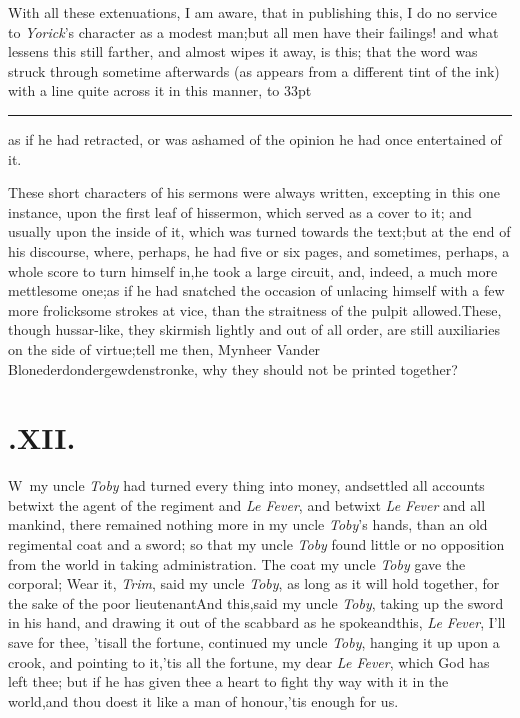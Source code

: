 \documentclass{article}
\begin{document}
With all these extenuations, I am aware, that in publishing
this, I do no service to \textit{Yorick}’s character as a
modest man;\tsk but all men have their failings! and what lessens
this still farther, and almost wipes it away, is this; that the
word was struck through sometime afterwards (as appears from a
different tint of the ink) with a line quite across it in this manner,
\hbox to 33pt{\leaders\hrule width 1pt height 3.4pt depth -3.1pt\hfill}\tsh as if he had retracted, or was
ashamed of the opinion he had once entertained of it.

These short characters of his sermons were always written,
excepting in this one instance, upon the first leaf of his\pb sermon,
which served as a cover to it; and usually upon the inside of it,
which was turned towards the text;\tsk but at the end of his
discourse, where, perhaps, he had five or six pages, and sometimes,
perhaps, a whole score to turn himself in,\tsk he took a large
circuit, and, indeed, a much more mettlesome one;\tsk as if he
had snatched the occasion of unlacing himself with a few more
frolicksome strokes at vice, than the straitness of the pulpit
allowed.\tsk These, though hussar-like, they skirmish lightly and
out of all order, are still auxiliaries on the side of
virtue;\tsk tell me then, Mynheer Vander
Blonederdondergewdenstronke, why they should not be printed
together?

\section{.\enspace XII.}

\lettrine{W}{\,} my uncle \textit{Toby} had turned
every thing into money, and\break settled all accounts betwixt the agent
of the regiment and \textit{Le Fever}, and betwixt \textit{Le Fever}
and all mankind,\tsh\break
there remained nothing more in my uncle \textit{Toby}’s hands, than an old
regimental coat and a sword; so that my uncle \textit{Toby} found little or no
opposition from the world in taking administration. The coat my uncle \textit{Toby}
gave the corporal;\break
\tsh Wear it, \textit{Trim}, said my uncle \textit{Toby}, as long
as it will hold together, for the sake of the poor lieutenant\tsh And this,\tsh said
my uncle \textit{Toby}, taking up the sword in his hand, and drawing it out of the
scabbard as he spoke\tsk and\break this, \textit{Le Fever}, I’ll save for thee,\tsk
’tis\pb all the fortune, continued my uncle \textit{Toby}, hanging it up upon a
crook, and pointing to it,\tsk ’tis all the fortune, my dear \textit{Le Fever},
which God has left thee; but if he has given thee a heart to fight thy way with it
in the world,\tsk and thou doest it like a man of honour,\tsk ’tis enough for us.
\end{document}
